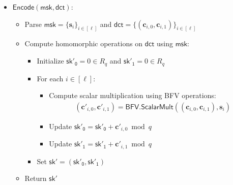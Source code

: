 \begin{itemize}
\item $\mathsf{Encode}(\mathsf{msk}, \mathsf{dct})$:
   \begin{itemize}
       \item Parse $\mathsf{msk}=\{\mathbf{s}_i\}_{i \in [\ell]}$ and $\mathsf{dct}=\{(\mathbf{c}_{i,0}, \mathbf{c}_{i,1})\}_{i \in [\ell]}$
       \item Compute homomorphic operations on $\mathsf{dct}$ using $\mathsf{msk}$:
           \begin{itemize}
               \item Initialize $\mathsf{sk'_0} = 0 \in R_q$ and $\mathsf{sk'_1} = 0 \in R_q$
               \item For each $i \in [\ell]$:
                   \begin{itemize}
                       \item Compute scalar multiplication using BFV operations: 
                           \begin{align*}
                           (\mathbf{c}'_{i,0}, \mathbf{c}'_{i,1}) = \mathsf{BFV.ScalarMult}((\mathbf{c}_{i,0}, \mathbf{c}_{i,1}), \mathbf{s}_i)
                           \end{align*}
                       \item Update $\mathsf{sk'_0} = \mathsf{sk'_0} + \mathbf{c}'_{i,0} \bmod q$
                       \item Update $\mathsf{sk'_1} = \mathsf{sk'_1} + \mathbf{c}'_{i,1} \bmod q$
                   \end{itemize}
               \item Set $\mathsf{sk'} = (\mathsf{sk'_0}, \mathsf{sk'_1})$
           \end{itemize}
       \item Return $\mathsf{sk'}$
   \end{itemize}


\end{itemize}
